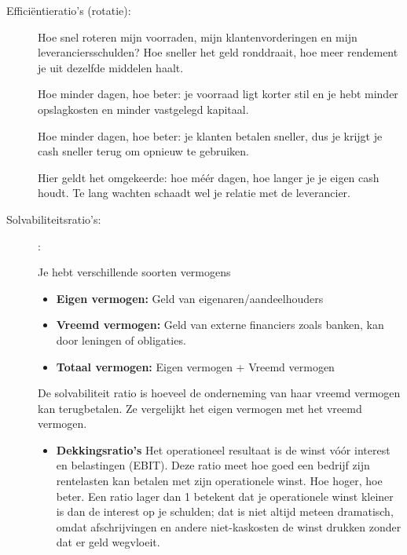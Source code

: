 \documentclass[a4paper,11pt]{article}
\begin{document}
\begin{description}
    \item[Efficiëntieratio's (rotatie):]
          Hoe snel roteren mijn voorraden, mijn klantenvorderingen en mijn leveranciersschulden?
          Hoe sneller het geld ronddraait, hoe meer rendement je uit dezelfde middelen haalt.

          {Hoe minder dagen, hoe beter: je voorraad ligt korter stil en je hebt minder opslagkosten
              en minder vastgelegd kapitaal.}

          {Hoe minder dagen, hoe beter: je klanten betalen sneller, dus je krijgt je cash sneller terug
              om opnieuw te gebruiken.}

          {Hier geldt het omgekeerde: hoe méér dagen, hoe langer je je eigen cash houdt.
              Te lang wachten schaadt wel je relatie met de leverancier.}


    \item[Solvabiliteitsratio's:]
          :

          Je hebt verschillende soorten vermogens
          \begin{itemize}
              \item \textbf{Eigen vermogen:} Geld van eigenaren/aandeelhouders
              \item \textbf{Vreemd vermogen:} Geld van externe financiers zoals banken, kan door
                    leningen of obligaties.
              \item \textbf{Totaal vermogen:} Eigen vermogen + Vreemd vermogen
          \end{itemize}

          De solvabiliteit ratio is hoeveel de onderneming van haar vreemd vermogen kan
          terugbetalen. Ze vergelijkt het eigen vermogen met het vreemd vermogen.


          \begin{itemize}
              \item \textbf{Dekkingsratio's}
                    {Het operationeel resultaat is de winst vóór interest en belastingen (EBIT).
                        Deze ratio meet hoe goed een bedrijf zijn rentelasten kan betalen met zijn operationele winst.
                        Hoe hoger, hoe beter. Een ratio lager dan 1 betekent dat je operationele winst kleiner is dan de
                        interest op je schulden; dat is niet altijd meteen dramatisch, omdat afschrijvingen en andere
                        niet-kaskosten de winst drukken zonder dat er geld wegvloeit.}


\end{itemize}
\end{description}
\end{document}
